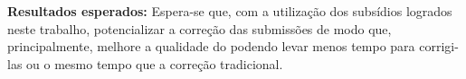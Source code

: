 \documentclass[12pt,english,brazil,a4paper,utf8,oneside]{utfpr-tcc}
\begin{document}
\begin{resumo}
\textbf{Resultados esperados:} Espera-se que, com a utilização dos subsídios logrados
neste trabalho, potencializar a correção das submissões de modo que, principalmente,
melhore a qualidade do  podendo levar menos tempo para corrigi-las
ou o mesmo tempo que a correção tradicional.


\end{resumo}







\listoffigures
\listoftables

\tableofcontents

\mainmatter







\backmatter
\appendix

\end{document}

